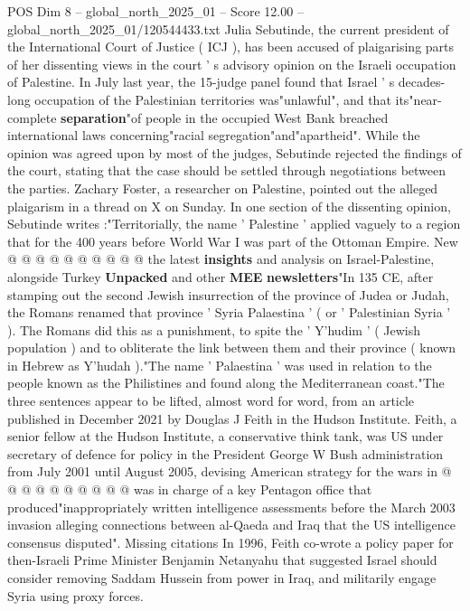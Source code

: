 \begin{textsample}{POS Dim 8 – global\_north\_2025\_01 – Score 12.00 – global\_north\_2025\_01/120544433.txt}  \label{ex:f8_pos_109}
Julia Sebutinde, the current president of the International Court of Justice ( ICJ ), has been accused of plaigarising parts of her dissenting views in the court ' s advisory opinion on the Israeli occupation of Palestine.
In July last year, the 15-judge panel found that Israel ' s decades-long occupation of the Palestinian territories was"unlawful", and that its"near-complete \textbf{separation}"of people in the occupied West Bank breached international laws concerning"racial segregation"and"apartheid".
While the opinion was agreed upon by most of the judges, Sebutinde rejected the findings of the court, stating that the case should be settled through negotiations between the parties.
Zachary Foster, a researcher on Palestine, pointed out the alleged plaigarism in a thread on X on Sunday.
In one section of the dissenting opinion, Sebutinde writes :"Territorially, the name ' Palestine ' applied vaguely to a region that for the 400 years before World War I was part of the Ottoman Empire.
New @ @ @ @ @ @ @ @ @ @ the latest \textbf{insights} and analysis on Israel-Palestine, alongside Turkey \textbf{Unpacked} and other \textbf{MEE} \textbf{newsletters}"In 135 CE, after stamping out the second Jewish insurrection of the province of Judea or Judah, the Romans renamed that province ' Syria Palaestina ' ( or ' Palestinian Syria ' ).
The Romans did this as a punishment, to spite the ' Y'hudim ' ( Jewish population ) and to obliterate the link between them and their province ( known in Hebrew as Y'hudah )."The name ' Palaestina ' was used in relation to the people known as the Philistines and found along the Mediterranean coast."The three sentences appear to be lifted, almost word for word, from an article published in December 2021 by Douglas J Feith in the Hudson Institute.
Feith, a senior fellow at the Hudson Institute, a conservative think tank, was US under secretary of defence for policy in the President George W Bush administration from July 2001 until August 2005, devising American strategy for the wars in @ @ @ @ @ @ @ @ @ @ was in charge of a key Pentagon office that produced"inappropriately written intelligence assessments before the March 2003 invasion alleging connections between al-Qaeda and Iraq that the US intelligence consensus disputed".
Missing citations In 1996, Feith co-wrote a policy paper for then-Israeli Prime Minister Benjamin Netanyahu that suggested Israel should consider removing Saddam Hussein from power in Iraq, and militarily engage Syria using proxy forces.

\end{textsample}
